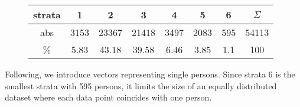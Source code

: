 	\vspace*{-3em}
	\begin{figure}[H]
		\centering
		\setlength\tabcolsep{.2cm}
		\begin{tabular}{c|ccccccc}
			strata &  1   &   2   &   3   &  4   &  5   &  6  & $\Sigma$ \\ \hline
			abs   & 3153 & 23367 & 21418 & 3497 & 2083 & 595 &  54113   \\
			\%   & 5.83 & 43.18 & 39.58 & 6.46 & 3.85 & 1.1 &   100
		\end{tabular}
		\vspace*{-2.5em}
	\end{figure}
	Following, we introduce vectors representing single persons. Since strata 6 is the smallest strata with 595 persons, it limits the size of an equally distributed dataset where each data point coincides with one person.\\
	
